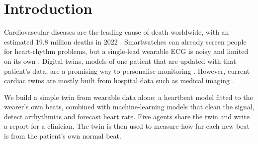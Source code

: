 \chapter{Introduction}
\label{chapter:introduction}

Cardiovascular diseases are the leading cause of death worldwide, with an estimated 19.8 million deaths in 2022 \cite{who2025cvd}. Smartwatches can already screen people for heart-rhythm problems, but a single-lead wearable ECG is noisy and limited on its own \cite{bayoumy2021smart}. Digital twins, models of one patient that are updated with that patient's data, are a promising way to personalise monitoring \cite{corralacero2020digital}. However, current cardiac twins are mostly built from hospital data such as medical imaging \cite{gillette2021framework}.

We build a simple twin from wearable data alone: a heartbeat model \cite{mcsharry2003dynamical} fitted to the wearer's own beats, combined with machine-learning models that clean the signal, detect arrhythmias and forecast heart rate. Five agents share the twin and write a report for a clinician. The twin is then used to measure how far each new beat is from the patient's own normal beat.
